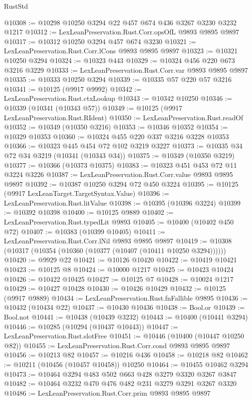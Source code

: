 \begin{lexlean}{RustStd}
\begin{coremodule}
@10308 := @10298 @10250 @3294 @22 @457 @674 @436 @3267 @3230 @3232 @1217
@10312 := LexLeanPreservation.Rust.Corr.opsOfL @9893 @9895 @9897
@10317 := @10312 @10250 @3294 @457 @674 @3230
@10321 := LexLeanPreservation.Rust.Corr.lCons @9893 @9895 @9897
@10323 := @10321 @10250 @3294
@10324 := @10323 @443
@10329 := @10324 @456 @220 @673 @3216 @3229
@10333 := LexLeanPreservation.Rust.Corr.var @9893 @9895 @9897
@10335 := @10333 @10250 @3294
@10339 := @10335 @57 @220 @57 @3216
@10341 := @10125 (@9917 @9992)
@10342 := LexLeanPreservation.Rust.ctxLookup
@10343 := @10342 @10250
@10346 := @10339 (@10341 (@10343 @57))
@10349 := @10125 (@9917 LexLeanPreservation.Rust.RIdent)
@10350 := LexLeanPreservation.Rust.readOf
@10352 := @10349 (@10350 @3216)
@10353 := @10346 @10352
@10354 := @10329 @10353
@10360 := @10324 @455 @220 @337 @3216 @3228 @10353
@10366 := @10323 @445 @454 @72 @102 @3219 @3227
@10373 := @10335 @34 @72 @34 @3219 (@10341 (@10343 @34))
@10375 := @10349 (@10350 @3219)
@10377 := @10366 (@10373 @10375)
@10383 := @10323 @451 @453 @72 @11 @3224 @3226
@10387 := LexLeanPreservation.Rust.Corr.value @9893 @9895 @9897
@10392 := @10387 @10250 @3294 @72 @450 @3224
@10395 := @10125 (@9917 LexLeanTarget.TargetSyntax.Value)
@10396 := LexLeanPreservation.Rust.litValue
@10398 := @10395 (@10396 @3224)
@10399 := @10392 @10398
@10400 := @10125 @9889
@10402 := LexLeanPreservation.Rust.typedLit @9893
@10405 := @10400 (@10402 @450 @72)
@10407 := @10383 (@10399 @10405)
@10411 := LexLeanPreservation.Rust.Corr.lNil @9893 @9895 @9897
@10419 := @10308 (@10317 (@10354 (@10360 (@10377 (@10407 (@10411 @10250 @3294))))))
@10420 := @9929 @22
@10421 := @10126 @10420
@10422 := @10419 @10421
@10423 := @10125 @8
@10424 := @10000 @1217
@10425 := @10423 @10424
@10426 := @10422 @10425
@10427 := @10125 @7
@10428 := @10024 @1217
@10429 := @10427 @10428
@10430 := @10426 @10429
@10432 := @10125 (@9917 @9889)
@10434 := LexLeanPreservation.Rust.fnFallible @9895
@10436 := @10432 (@10434 @22)
@10437 := @10430 @10436
@10438 := Bool.or
@10439 := Bool.not
@10441 := @10438 (@10439 @3232)
@10443 := @10400 (@10441 @3294)
@10446 := @10285 (@10294 (@10437 @10443))
@10447 := LexLeanPreservation.Rust.slotFree
@10451 := @10446 (@10400 (@10447 @10250 @82))
@10455 := LexLeanPreservation.Rust.Corr.cond @9893 @9895 @9897
@10456 := @10213 @82
@10457 := @10216 @436
@10458 := @10218 @82
@10462 := @10211 (@10456 (@10457 @10458)) @10250
@10464 := @10455 @10462 @3294
@10473 := @10464 @3294 @483 @502 @663 @428 @3279 @3320 @3267 @3847
@10482 := @10464 @3232 @470 @476 @482 @231 @3279 @3291 @3267 @3320
@10486 := LexLeanPreservation.Rust.Corr.prim @9893 @9895 @9897

\end{coremodule}
\end{lexlean}
